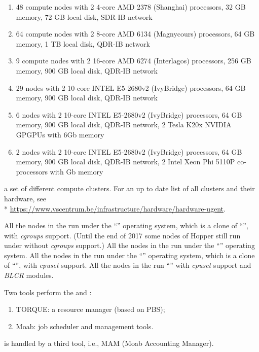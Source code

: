 \fi
\ifbrussel
  \begin{enumerate}
    \item  48 compute nodes with 2 4-core AMD 2378 (Shanghai) processors, 32 GB
    memory, 72 GB local disk, SDR-IB network
    \item  64 compute nodes with 2 8-core AMD 6134 (Magnycours) processors, 64
    GB memory, 1 TB local disk, QDR-IB network
    \item  9 compute nodes with 2 16-core AMD 6274 (Interlagos) processors, 256
    GB memory, 900 GB local disk, QDR-IB network
    \item  29 nodes with 2 10-core INTEL E5-2680v2 (IvyBridge) processors, 64
    GB memory, 900 GB local disk, QDR-IB network
    \item  6 nodes with 2 10-core INTEL E5-2680v2 (IvyBridge) processors, 64 GB
    memory, 900 GB local disk, QDR-IB network, 2 Tesla K20x NVIDIA GPGPUs with
    6Gb memory
    \item  2 nodes with 2 10-core INTEL E5-2680v2 (IvyBridge) processors, 64 GB
    memory, 900 GB local disk, QDR-IB network, 2 Intel Xeon Phi 5110P
    co-processors with Gb memory
  \end{enumerate}
\fi
\ifgent
  a set of different compute clusters. For an up to date list of all clusters and their hardware, see\\*
  \url{https://www.vscentrum.be/infrastructure/hardware/hardware-ugent}.
\fi

\ifantwerpen
All the nodes in the \hpc run under the ``\operatingsystemCOS'' operating
system, which is a clone of ``\operatingsystemRHEL'',
with \emph{cgroups} support. (Until the end of 2017 some nodes of Hopper
still run under \operatingsystemSL without \emph{cgroups} support.)
\fi
\ifleuven
All the nodes in the \hpc run under the ``\operatingsystem'' operating system.
\fi
\ifbrussel
All the nodes in the \hpc run under the ``\operatingsystemSL'' operating
system, which is a clone of ``\operatingsystemRHEL'',
with \emph{cpuset} support.
\fi
\ifgent
All the nodes in the \hpc run ``\operatingsystem''
with \emph{cpuset} support and \emph{BLCR} modules.
\fi

Two tools perform the  and :
\begin{enumerate}
  \item  TORQUE: a resource manager (based on PBS);
  \item  Moab: job scheduler and management tools.
\end{enumerate}
\ifantwerpen
\fi
\ifleuven
{} is handled by a third tool, i.e., MAM (Moab Accounting
Manager).
\fi

